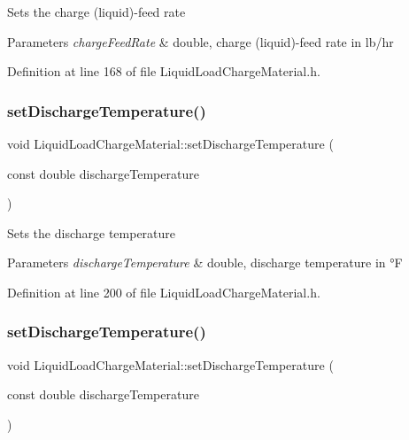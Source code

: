 Sets the charge (liquid)-\/feed rate 
\begin{DoxyParams}{Parameters}
{\em charge\+Feed\+Rate} & double, charge (liquid)-\/feed rate in lb/hr \\
\hline
\end{DoxyParams}


Definition at line 168 of file Liquid\+Load\+Charge\+Material.\+h.

\mbox{\label{class_liquid_load_charge_material_a04ef0778e524f531b6dd2dd6137c270d}} 
\subsubsection{\texorpdfstring{set\+Discharge\+Temperature()}{setDischargeTemperature()}\hspace{0.1cm}{\footnotesize\ttfamily [1/3]}}
{\footnotesize\ttfamily void Liquid\+Load\+Charge\+Material\+::set\+Discharge\+Temperature (\begin{DoxyParamCaption}\item[{const double}]{discharge\+Temperature }\end{DoxyParamCaption})\hspace{0.3cm}{\ttfamily [inline]}}

Sets the discharge temperature 
\begin{DoxyParams}{Parameters}
{\em discharge\+Temperature} & double, discharge temperature in °F \\
\hline
\end{DoxyParams}


Definition at line 200 of file Liquid\+Load\+Charge\+Material.\+h.

\mbox{\label{class_liquid_load_charge_material_a04ef0778e524f531b6dd2dd6137c270d}} 
\subsubsection{\texorpdfstring{set\+Discharge\+Temperature()}{setDischargeTemperature()}\hspace{0.1cm}{\footnotesize\ttfamily [2/3]}}
{\footnotesize\ttfamily void Liquid\+Load\+Charge\+Material\+::set\+Discharge\+Temperature (\begin{DoxyParamCaption}\item[{const double}]{discharge\+Temperature }\end{DoxyParamCaption})\hspace{0.3cm}{\ttfamily [inline]}}

